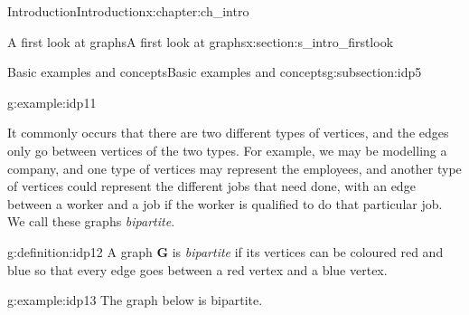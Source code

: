 \documentclass[oneside,10pt,]{book}
\numberwithin{equation}{section}
\newcommand{\bfG}{\mathbf{G}}
\begin{document}
\begin{chapterptx}{Introduction}{}{Introduction}{}{}{x:chapter:ch_intro}
\begin{sectionptx}{A first look at graphs}{}{A first look at graphs}{}{}{x:section:s_intro_firstlook}
\begin{subsectionptx}{Basic examples and concepts}{}{Basic examples and concepts}{}{}{g:subsection:idp5}
\begin{example}{}{g:example:idp11}
\begin{image}{0.05}{0.9}{0.05}
{
}%
\end{image}%
\end{example}
It commonly occurs that there are two different types of vertices, and the edges only go between vertices of the two types.  For example, we may be modelling a company, and one type of vertices may represent the employees, and another type of vertices could represent the different jobs that need done, with an edge between a worker and a job if the worker is qualified to do that particular job.  We call these graphs \emph{bipartite}.%
\begin{definition}{}{g:definition:idp12}%
A graph \(\bfG\) is \emph{bipartite} if its vertices can be coloured red and blue so that every edge goes between a red vertex and a blue vertex.%
\end{definition}
\begin{example}{}{g:example:idp13}%
The graph below is bipartite.%
\begin{image}{0.05}{0.9}{0.05}%
\end{image}
\end{example}
\end{subsectionptx}
\end{sectionptx}
\end{chapterptx}
\end{document}
